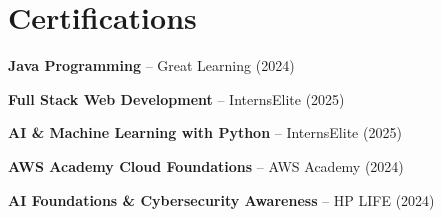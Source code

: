 \documentclass[letterpaper,10pt]{article}
\begin{document}
\section{Certifications}
 \begin{itemize}[leftmargin=0.15in]
    \small{
      \item \textbf{Java Programming} -- Great Learning (2024)
      \item \textbf{Full Stack Web Development} -- InternsElite (2025)
      \item \textbf{AI \& Machine Learning with Python} -- InternsElite (2025)
      \item \textbf{AWS Academy Cloud Foundations} -- AWS Academy (2024)
      \item \textbf{AI Foundations \& Cybersecurity Awareness} -- HP LIFE (2024)
    }
 \end{itemize}

\end{document}
